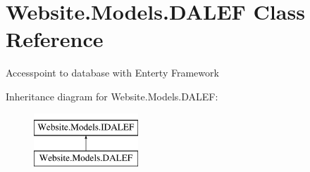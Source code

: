 \hypertarget{class_website_1_1_models_1_1_d_a_l_e_f}{}\section{Website.\+Models.\+D\+A\+L\+E\+F Class Reference}
\label{class_website_1_1_models_1_1_d_a_l_e_f}


Accesspoint to database with Enterty Framework  


Inheritance diagram for Website.\+Models.\+D\+A\+L\+E\+F\+:\begin{figure}[H]
\begin{center}
\leavevmode
\includegraphics[height=2.000000cm]{class_website_1_1_models_1_1_d_a_l_e_f}
\end{center}
\end{figure}
